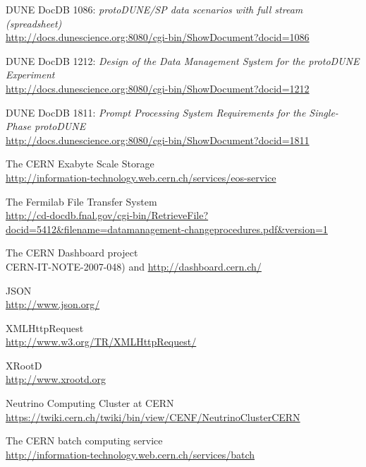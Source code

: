 \documentclass[pdftex,12pt,letter]{article}
\begin{document}
\clearpage
\begin{thebibliography}{1}
{DUNE DocDB 1086: \textit{ protoDUNE/SP data scenarios with full stream (spreadsheet)}}\\
\url{http://docs.dunescience.org:8080/cgi-bin/ShowDocument?docid=1086}





{DUNE DocDB 1212: \textit{Design of the Data Management System for the protoDUNE Experiment}}\\
\url{http://docs.dunescience.org:8080/cgi-bin/ShowDocument?docid=1212}

{DUNE DocDB 1811: \textit{Prompt Processing System Requirements for the Single-Phase protoDUNE}}\\
\url{http://docs.dunescience.org:8080/cgi-bin/ShowDocument?docid=1811}

{The CERN Exabyte Scale Storage}\\
\url{http://information-technology.web.cern.ch/services/eos-service}

{The Fermilab File Transfer System}\\
\url{http://cd-docdb.fnal.gov/cgi-bin/RetrieveFile?docid=5412&filename=datamanagement-changeprocedures.pdf&version=1}

{The CERN Dashboard project}\\
CERN-IT-NOTE-2007-048) and \url{http://dashboard.cern.ch/}

{JSON} \\
\url{http://www.json.org/}
   
{XMLHttpRequest} \\
\url{http://www.w3.org/TR/XMLHttpRequest/ }
    
{XRootD}\\
\url{http://www.xrootd.org}

{Neutrino Computing Cluster at CERN}\\
\url{https://twiki.cern.ch/twiki/bin/view/CENF/NeutrinoClusterCERN}

{The CERN batch computing service}\\
\url{http://information-technology.web.cern.ch/services/batch}

\end{thebibliography}
\end{document}
